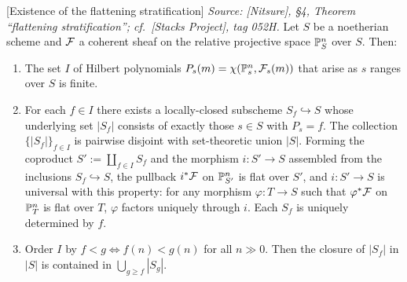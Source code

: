 \begin{theorem}

[Existence of the flattening stratification]
  \label{thm:flattening_stratification_exists}
  \textit{Source: [Nitsure], \S4, Theorem ``flattening stratification'';
  cf.\ [Stacks Project], tag 052H.}
  Let \(S\) be a noetherian scheme and \(\mathcal{F}\) a coherent sheaf on the relative
  projective space \(\mathbb{P}^n_S\) over \(S\).  Then:
  \begin{enumerate}[label=(\roman*)]
    \item The set \(I\) of Hilbert polynomials
      \(P_s(m) = \chi(\mathbb{P}^n_s, \mathcal{F}_s(m))\) that arise as \(s\) ranges over \(S\) is
      finite.
    \item For each \(f \in I\) there exists a locally-closed subscheme
      \(S_f \hookrightarrow S\) whose underlying set \(|S_f|\) consists of exactly
      those \(s \in S\) with \(P_s = f\).  The collection \(\{|S_f|\}_{f \in I}\) is
      pairwise disjoint with set-theoretic union \(|S|\).  Forming the coproduct
      \(S' := \coprod_{f \in I} S_f\) and the morphism \(i : S' \to S\) assembled
      from the inclusions \(S_f \hookrightarrow S\), the pullback \(i^* \mathcal{F}\) on
      \(\mathbb{P}^n_{S'}\) is flat over \(S'\), and \(i : S' \to S\) is universal with this
      property: for any morphism \(\varphi : T \to S\) such that \(\varphi^* \mathcal{F}\) on
      \(\mathbb{P}^n_T\) is flat over \(T\), \(\varphi\) factors uniquely through \(i\).
      Each \(S_f\) is uniquely determined by \(f\).
    \item Order \(I\) by \(f < g \iff f(n) < g(n)\) for all \(n \gg 0\). Then the
      closure of \(|S_f|\) in \(|S|\) is contained in \(\bigcup_{g \ge f} |S_g|\).
  \end{enumerate}
\end{theorem}

